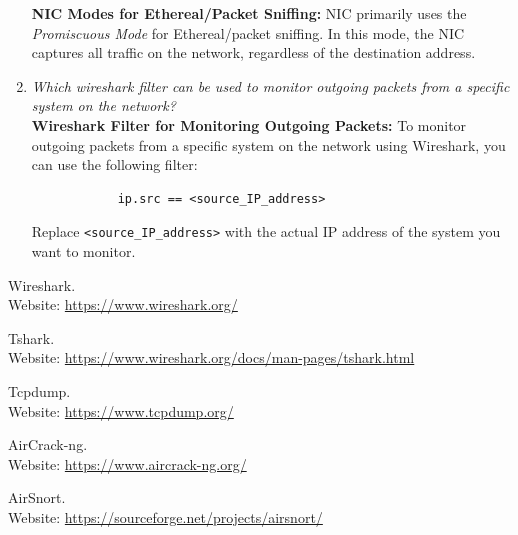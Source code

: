 \documentclass[11pt]{article}
\begin{document}
\begin{enumerate}
	      \textbf{NIC Modes for Ethereal/Packet Sniffing:} NIC primarily uses the \textit{Promiscuous Mode} for Ethereal/packet sniffing. In this mode, the NIC captures all traffic on the network, regardless of the destination address.
	\item \textit{Which wireshark filter can be used to monitor outgoing packets from a specific
		      system on the network?}\\

	      \textbf{Wireshark Filter for Monitoring Outgoing Packets:} To monitor outgoing packets from a specific system on the network using Wireshark, you can use the following filter:
	      \begin{verbatim}
            ip.src == <source_IP_address>
        \end{verbatim}
	      Replace \texttt{<source\_IP\_address>} with the actual IP address of the system
	      you want to monitor.
\end{enumerate}

\clearpage
\begin{thebibliography}{99}
	Wireshark. \\
	Website: \url{https://www.wireshark.org/}

	Tshark. \\
	Website: \url{https://www.wireshark.org/docs/man-pages/tshark.html}

	Tcpdump. \\
	Website: \url{https://www.tcpdump.org/}

	AirCrack-ng. \\
	Website: \url{https://www.aircrack-ng.org/}

	AirSnort. \\
	Website: \url{https://sourceforge.net/projects/airsnort/}
\end{thebibliography}
\end{document}
